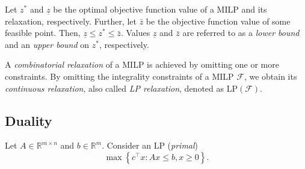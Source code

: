 Let $z^*$ and $\underline{z}$ be the optimal objective function value of a MILP and its relaxation, respectively. 
Further, let $\bar{z}$ be the objective function value of some feasible point.
Then, $\underline{z}\leq z^* \leq \bar{z}$.
Values $\underline{z}$ and $\bar{z}$ are referred to as a \emph{lower bound} and an \emph{upper bound} on $z^*$, respectively.

A \emph{combinatorial relaxation} of a MILP is achieved by omitting one or more constraints. 
By omitting the integrality constraints of a MILP $\mathcal{F}$, we obtain its \emph{continuous relaxation}, also called \emph{LP relaxation}, denoted as LP$(\mathcal{F})$.

\subsection{Duality}

Let $A\in \mathbb{R}^{m\times n}$ and $b\in\mathbb{R}^m$.
Consider an LP (\emph{primal})
\begin{equation}
	\max \left\{c^\top x  :  Ax \leq b, x \geq 0\right\}. 
\label{eq:lpprimal}
\end{equation}

